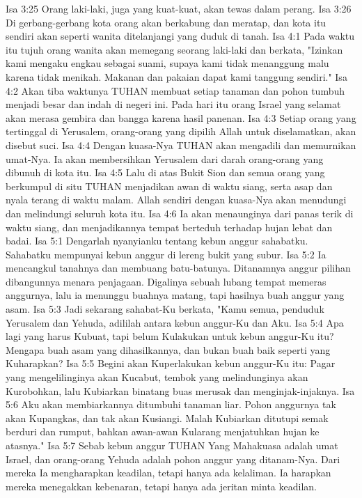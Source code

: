 Isa 3:25  Orang laki-laki, juga yang kuat-kuat, akan tewas dalam perang.
Isa 3:26  Di gerbang-gerbang kota orang akan berkabung dan meratap, dan kota itu sendiri akan seperti wanita ditelanjangi yang duduk di tanah.
Isa 4:1  Pada waktu itu tujuh orang wanita akan memegang seorang laki-laki dan berkata, "Izinkan kami mengaku engkau sebagai suami, supaya kami tidak menanggung malu karena tidak menikah. Makanan dan pakaian dapat kami tanggung sendiri."
Isa 4:2  Akan tiba waktunya TUHAN membuat setiap tanaman dan pohon tumbuh menjadi besar dan indah di negeri ini. Pada hari itu orang Israel yang selamat akan merasa gembira dan bangga karena hasil panenan.
Isa 4:3  Setiap orang yang tertinggal di Yerusalem, orang-orang yang dipilih Allah untuk diselamatkan, akan disebut suci.
Isa 4:4  Dengan kuasa-Nya TUHAN akan mengadili dan memurnikan umat-Nya. Ia akan membersihkan Yerusalem dari darah orang-orang yang dibunuh di kota itu.
Isa 4:5  Lalu di atas Bukit Sion dan semua orang yang berkumpul di situ TUHAN menjadikan awan di waktu siang, serta asap dan nyala terang di waktu malam. Allah sendiri dengan kuasa-Nya akan menudungi dan melindungi seluruh kota itu.
Isa 4:6  Ia akan menaunginya dari panas terik di waktu siang, dan menjadikannya tempat berteduh terhadap hujan lebat dan badai.
Isa 5:1  Dengarlah nyanyianku tentang kebun anggur sahabatku. Sahabatku mempunyai kebun anggur di lereng bukit yang subur.
Isa 5:2  Ia mencangkul tanahnya dan membuang batu-batunya. Ditanamnya anggur pilihan dibangunnya menara penjagaan. Digalinya sebuah lubang tempat memeras anggurnya, lalu ia menunggu buahnya matang, tapi hasilnya buah anggur yang asam.
Isa 5:3  Jadi sekarang sahabat-Ku berkata, "Kamu semua, penduduk Yerusalem dan Yehuda, adililah antara kebun anggur-Ku dan Aku.
Isa 5:4  Apa lagi yang harus Kubuat, tapi belum Kulakukan untuk kebun anggur-Ku itu? Mengapa buah asam yang dihasilkannya, dan bukan buah baik seperti yang Kuharapkan?
Isa 5:5  Begini akan Kuperlakukan kebun anggur-Ku itu: Pagar yang mengelilinginya akan Kucabut, tembok yang melindunginya akan Kurobohkan, lalu Kubiarkan binatang buas merusak dan menginjak-injaknya.
Isa 5:6  Aku akan membiarkannya ditumbuhi tanaman liar. Pohon anggurnya tak akan Kupangkas, dan tak akan Kusiangi. Malah Kubiarkan ditutupi semak berduri dan rumput, bahkan awan-awan Kularang menjatuhkan hujan ke atasnya."
Isa 5:7  Sebab kebun anggur TUHAN Yang Mahakuasa adalah umat Israel, dan orang-orang Yehuda adalah pohon anggur yang ditanam-Nya. Dari mereka Ia mengharapkan keadilan, tetapi hanya ada kelaliman. Ia harapkan mereka menegakkan kebenaran, tetapi hanya ada jeritan minta keadilan.
